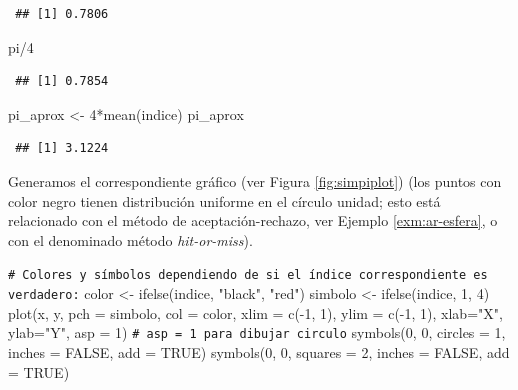 \documentclass[
  10pt,
]{book}
\newenvironment{Shaded}{\begin{snugshade}}{\end{snugshade}}
\newcommand{\AttributeTok}[1]{\textcolor[rgb]{0.77,0.63,0.00}{#1}}
\newcommand{\CommentTok}[1]{\textcolor[rgb]{0.56,0.35,0.01}{\textit{#1}}}
\newcommand{\ConstantTok}[1]{\textcolor[rgb]{0.00,0.00,0.00}{#1}}
\newcommand{\DecValTok}[1]{\textcolor[rgb]{0.00,0.00,0.81}{#1}}
\newcommand{\FunctionTok}[1]{\textcolor[rgb]{0.00,0.00,0.00}{#1}}
\newcommand{\NormalTok}[1]{#1}
\newcommand{\OtherTok}[1]{\textcolor[rgb]{0.56,0.35,0.01}{#1}}
\newcommand{\SpecialCharTok}[1]{\textcolor[rgb]{0.00,0.00,0.00}{#1}}
\newcommand{\StringTok}[1]{\textcolor[rgb]{0.31,0.60,0.02}{#1}}
\theoremstyle{break}
\theoremstyle{nonumberplain}
\renewcommand{\CommentTok}[1]{\textcolor[rgb]{0.41,0.41,0.41}{\texttt{#1}}}
\begin{document}
\begin{verbatim}
 ## [1] 0.7806
\end{verbatim}

\begin{Shaded}
\begin{Highlighting}[]
\NormalTok{pi}\SpecialCharTok{/}\DecValTok{4}
\end{Highlighting}
\end{Shaded}

\begin{verbatim}
 ## [1] 0.7854
\end{verbatim}

\begin{Shaded}
\begin{Highlighting}[]
\NormalTok{pi\_aprox }\OtherTok{\textless{}{-}} \DecValTok{4}\SpecialCharTok{*}\FunctionTok{mean}\NormalTok{(indice)}
\NormalTok{pi\_aprox}
\end{Highlighting}
\end{Shaded}

\begin{verbatim}
 ## [1] 3.1224
\end{verbatim}

Generamos el correspondiente gráfico (ver Figura \ref{fig:simpiplot}) (los puntos con color negro tienen distribución uniforme en el círculo unidad; esto está relacionado con el método de aceptación-rechazo, ver Ejemplo \ref{exm:ar-esfera}, o con el denominado método \emph{hit-or-miss}).

\begin{Shaded}
\begin{Highlighting}[]
\CommentTok{\# Colores y símbolos dependiendo de si el índice correspondiente es verdadero:}
\NormalTok{color }\OtherTok{\textless{}{-}} \FunctionTok{ifelse}\NormalTok{(indice, }\StringTok{"black"}\NormalTok{, }\StringTok{"red"}\NormalTok{) }
\NormalTok{simbolo }\OtherTok{\textless{}{-}} \FunctionTok{ifelse}\NormalTok{(indice, }\DecValTok{1}\NormalTok{, }\DecValTok{4}\NormalTok{)}
\FunctionTok{plot}\NormalTok{(x, y, }\AttributeTok{pch =}\NormalTok{ simbolo, }\AttributeTok{col =}\NormalTok{ color, }
     \AttributeTok{xlim =} \FunctionTok{c}\NormalTok{(}\SpecialCharTok{{-}}\DecValTok{1}\NormalTok{, }\DecValTok{1}\NormalTok{), }\AttributeTok{ylim =} \FunctionTok{c}\NormalTok{(}\SpecialCharTok{{-}}\DecValTok{1}\NormalTok{, }\DecValTok{1}\NormalTok{), }\AttributeTok{xlab=}\StringTok{"X"}\NormalTok{, }\AttributeTok{ylab=}\StringTok{"Y"}\NormalTok{, }\AttributeTok{asp =} \DecValTok{1}\NormalTok{) }
     \CommentTok{\# asp = 1 para dibujar circulo}
\FunctionTok{symbols}\NormalTok{(}\DecValTok{0}\NormalTok{, }\DecValTok{0}\NormalTok{, }\AttributeTok{circles =} \DecValTok{1}\NormalTok{, }\AttributeTok{inches =} \ConstantTok{FALSE}\NormalTok{, }\AttributeTok{add =} \ConstantTok{TRUE}\NormalTok{)}
\FunctionTok{symbols}\NormalTok{(}\DecValTok{0}\NormalTok{, }\DecValTok{0}\NormalTok{, }\AttributeTok{squares =} \DecValTok{2}\NormalTok{, }\AttributeTok{inches =} \ConstantTok{FALSE}\NormalTok{, }\AttributeTok{add =} \ConstantTok{TRUE}\NormalTok{)}
\end{Highlighting}
\end{Shaded}
\end{document}
